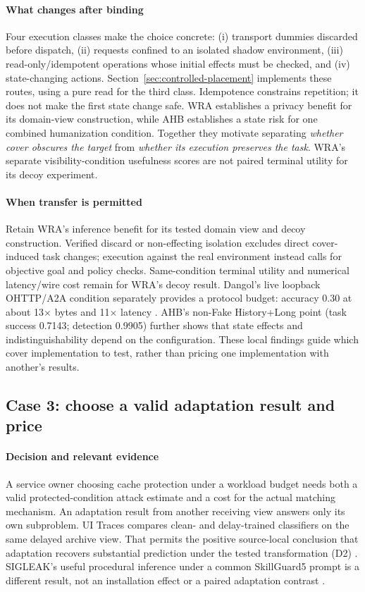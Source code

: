 \paragraph{What changes after binding}
Four execution classes make the choice concrete: (i) transport dummies discarded before dispatch, (ii) requests confined to an isolated shadow environment, (iii) read-only/idempotent operations whose initial effects must be checked, and (iv) state-changing actions. Section~\ref{sec:controlled-placement} implements these routes, using a pure read for the third class. Idempotence constrains repetition; it does not make the first state change safe. WRA establishes a privacy benefit for its domain-view construction, while AHB establishes a state risk for one combined humanization condition. Together they motivate separating \emph{whether cover obscures the target} from \emph{whether its execution preserves the task}. WRA's separate visibility-condition usefulness scores are not paired terminal utility for its decoy experiment.

\paragraph{When transfer is permitted}
Retain WRA's inference benefit for its tested domain view and decoy construction. Verified discard or non-effecting isolation excludes direct cover-induced task changes; execution against the real environment instead calls for objective goal and policy checks. Same-condition terminal utility and numerical latency/wire cost remain \NRR{} for WRA's decoy result. Dangol's live loopback OHTTP/A2A condition separately provides a protocol budget: accuracy 0.30 at about 13$\times$ bytes and 11$\times$ latency \cite{dangol2026workflow}. AHB's non-Fake History+Long point (task success 0.7143; detection 0.9905) further shows that state effects and indistinguishability depend on the configuration. These local findings guide which cover implementation to test, rather than pricing one implementation with another's results.

\subsection{Case 3: choose a valid adaptation result and price}
\paragraph{Decision and relevant evidence}
A service owner choosing cache protection under a workload budget needs both a valid protected-condition attack estimate and a cost for the actual matching mechanism. An adaptation result from another receiving view answers only its own subproblem. UI Traces compares clean- and delay-trained classifiers on the same delayed archive view. That permits the positive source-local conclusion that adaptation recovers substantial prediction under the tested transformation (D2) \cite{uitraces2026}. SIGLEAK's useful procedural inference under a common SkillGuard5 prompt is a different result, not an installation effect or a paired adaptation contrast \cite{geng2026sigleak}.

